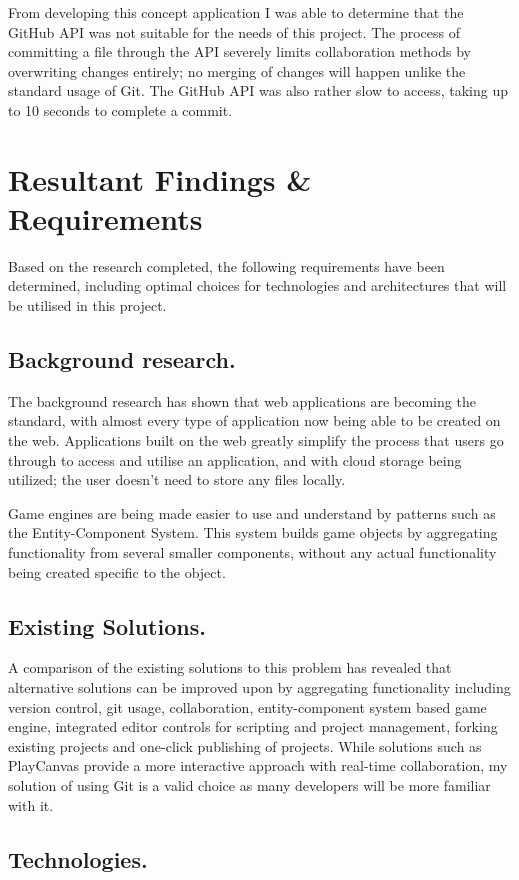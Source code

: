 From developing this concept application I was able to determine that the GitHub API was not suitable for the needs of this project. The process of committing a file through the API severely limits collaboration methods by overwriting changes entirely; no merging of changes will happen unlike the standard usage of Git. The GitHub API was also rather slow to access, taking up to 10 seconds to complete a commit.

\section{Resultant Findings \& Requirements}
Based on the research completed, the following requirements have been determined, including optimal choices for technologies and architectures that will be utilised in this project.

\subsection{Background research.}
The background research has shown that web applications are becoming the standard, with almost every type of application now being able to be created on the web. Applications built on the web greatly simplify the process that users go through to access and utilise an application, and with cloud storage being utilized; the user doesn't need to store any files locally.

Game engines are being made easier to use and understand by patterns such as the Entity-Component System. This system builds game objects by aggregating functionality from several smaller components, without any actual functionality being created specific to the object.

\subsection{Existing Solutions.}
A comparison of the existing solutions to this problem has revealed that alternative solutions can be improved upon by aggregating functionality including version control, git usage, collaboration, entity-component system based game engine, integrated editor controls for scripting and project management, forking existing projects and one-click publishing of projects. While solutions such as PlayCanvas provide a more interactive approach with real-time collaboration, my solution of using Git is a valid choice as many developers will be more familiar with it.

\subsection{Technologies.}
